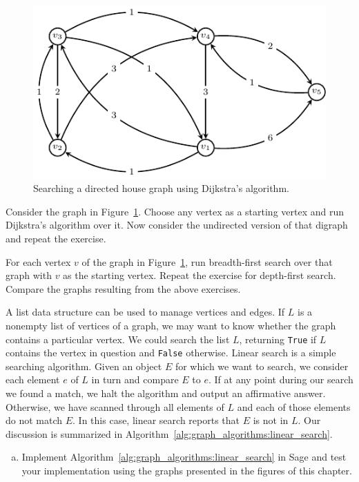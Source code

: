 \begin{problem}
\begin{figure}[!htbp]
\centering
\includegraphics{image/graph-algorithms/Dijkstra-directed-house-graph}
\caption{Searching a directed house graph using Dijkstra's algorithm.}
\label{fig:graph_algorithms:Dijkstra_directed_house_graph}
\end{figure}

\item Consider the graph in
  Figure~\ref{fig:graph_algorithms:Dijkstra_directed_house_graph}. Choose
  any vertex as a starting vertex and run Dijkstra's algorithm over
  it. Now consider the undirected version of that digraph and repeat
  the exercise.

\item For each vertex $v$ of the graph in
  Figure~\ref{fig:graph_algorithms:Dijkstra_directed_house_graph}, run
  breadth-first search over that graph
  with $v$ as the starting vertex. Repeat the exercise for
  depth-first search. Compare the graphs
  resulting from the above exercises.

\item A list data structure can be used to manage vertices and
  edges. If $L$ is a nonempty list of vertices of a graph, we may want
  to know whether the graph contains a particular vertex. We could
  search the list $L$, returning \texttt{True} if $L$ contains the
  vertex in question and \texttt{False} otherwise. Linear search is a
  simple searching algorithm. Given an object $E$ for which we want to
  search, we consider each element $e$ of $L$ in turn and compare $E$
  to $e$. If at any point during our search we found a match, we halt
  the algorithm and output an affirmative answer. Otherwise, we have
  scanned through all elements of $L$ and each of those elements do
  not match $E$. In this case, linear search reports that $E$ is not
  in $L$. Our discussion is summarized in
  Algorithm~\ref{alg:graph_algorithms:linear_search}.
  \begin{enumerate}[(a)]
  \item Implement Algorithm~\ref{alg:graph_algorithms:linear_search}
    in Sage and test your implementation using the graphs presented in
    the figures of this chapter.


\end{enumerate}
\end{problem}
